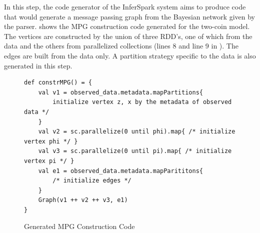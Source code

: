 In this step, the code generator of the InferSpark system
aims to produce code that would generate a message passing graph from the Bayesian network
given by the parser.
 shows the MPG construction code
generated for the two-coin model.
The vertices are constructed by the union
of three RDD's, one of which from the data and the others from
parallelized collections (lines 8 and line 9 in ).
The edges are built from the data only.
A partition strategy specific to the
data is also generated in this step.





\begin{figure}[h]
\begin{lstlisting}
def constrMPG() = {
	val v1 = observed_data.metadata.mapPartitions{
		initialize vertex z, x by the metadata of observed data */
	}
	val v2 = sc.parallelize(0 until phi).map{ /* initialize vertex phi */ }
	val v3 = sc.parallelize(0 until pi).map{ /* initialize vertex pi */ }
	val e1 = observed_data.metadata.mapParititons{
		/* initialize edges */
	}
	Graph(v1 ++ v2 ++ v3, e1)
}
\end{lstlisting}
\caption{Generated MPG Construction Code}
\label{fig:two_coins_mpg_constr_code}
\end{figure}


